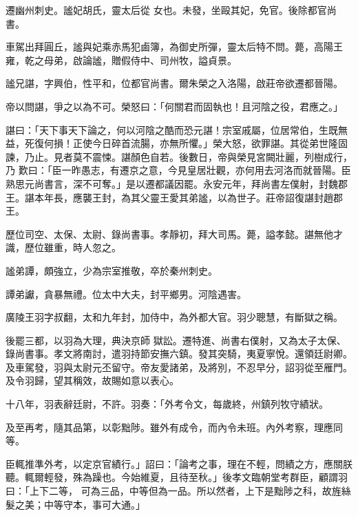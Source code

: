 \begin{pinyinscope}
 遷幽州刺史。謐妃胡氏，靈太后從
 女也。未發，坐毆其妃，免官。後除都官尚書。



 車駕出拜圓丘，謐與妃乘赤馬犯鹵簿，為御史所彈，靈太后特不問。薨，高陽王雍，乾之母弟，啟論謐，贈假侍中、司州牧，謚貞景。



 謐兄諶，字興伯，性平和，位都官尚書。爾朱榮之入洛陽，啟莊帝欲遷都晉陽。



 帝以問諶，爭之以為不可。榮怒曰：「何關君而固執也！且河陰之役，君應之。」



 諶曰：「天下事天下論之，何以河陰之酷而恐元諶！宗室戚屬，位居常伯，生既無益，死復何損！正使今日碎首流腸，亦無所懼。」榮大怒，欲罪諶。其從弟世隆固諫，乃止。見者莫不震悚。諶顏色自若。後數日，帝與榮見宮闕壯麗，列樹成行，乃
 歎曰：「臣一昨愚志，有遷京之意，今見皇居壯觀，亦何用去河洛而就晉陽。臣熟思元尚書言，深不可奪。」是以遷都議因罷。永安元年，拜尚書左僕射，封魏郡王。諶本年長，應襲王封，為其父靈王愛其弟謐，以為世子。莊帝詔復諶封趙郡王。



 歷位司空、太保、太尉、錄尚書事。孝靜初，拜大司馬。薨，謚孝懿。諶無他才識，歷位雖重，時人忽之。



 謐弟譚，頗強立，少為宗室推敬，卒於秦州刺史。



 譚弟讞，貪暴無禮。位太中大夫，封平鄉男。河陰遇害。



 廣陵王羽字叔翻，太和九年封，加侍中，為外都大官。羽少聰慧，有斷獄之稱。



 後罷三都，以羽為大理，典決京師
 獄訟。遷特進、尚書右僕射，又為太子太保、錄尚書事。孝文將南討，遣羽持節安撫六鎮。發其突騎，夷夏寧悅。還領廷尉卿。及車駕發，羽與太尉元丕留守。帝友愛諸弟，及將別，不忍早分，詔羽從至雁門。及令羽歸，望其稱效，故賜如意以表心。



 十八年，羽表辭廷尉，不許。羽奏：「外考令文，每歲終，州鎮列牧守績狀。



 及至再考，隨其品第，以彰黜陟。雖外有成令，而內令未班。內外考察，理應同等。



 臣輒推準外考，以定京官績行。」詔曰：「論考之事，理在不輕，問績之方，應關朕聽。輒爾輕發，殊為躁也。今始維夏，且待至秋。」後孝文臨朝堂考群臣，顧謂羽曰：「上下二等，
 可為三品，中等但為一品。所以然者，上下是黜陟之科，故旌絲髮之美；中等守本，事可大通。」




\end{pinyinscope}
